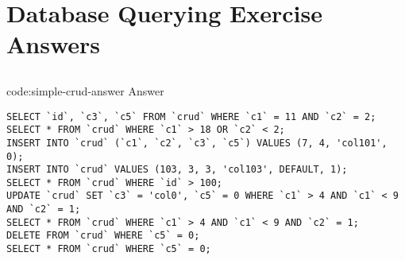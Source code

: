 \section{Database Querying Exercise Answers}\label{sect:database-querying-answers}

\subsection*{}

\begin{codeenv}{code:simple-crud-answer}{ Answer}\begin{verbatim}
SELECT `id`, `c3`, `c5` FROM `crud` WHERE `c1` = 11 AND `c2` = 2;
SELECT * FROM `crud` WHERE `c1` > 18 OR `c2` < 2;
INSERT INTO `crud` (`c1`, `c2`, `c3`, `c5`) VALUES (7, 4, 'col101', 0);
INSERT INTO `crud` VALUES (103, 3, 3, 'col103', DEFAULT, 1);
SELECT * FROM `crud` WHERE `id` > 100;
UPDATE `crud` SET `c3` = 'col0', `c5` = 0 WHERE `c1` > 4 AND `c1` < 9 AND `c2` = 1;
SELECT * FROM `crud` WHERE `c1` > 4 AND `c1` < 9 AND `c2` = 1;
DELETE FROM `crud` WHERE `c5` = 0;
SELECT * FROM `crud` WHERE `c5` = 0;
\end{verbatim}
\end{codeenv}

\subsection*{}


